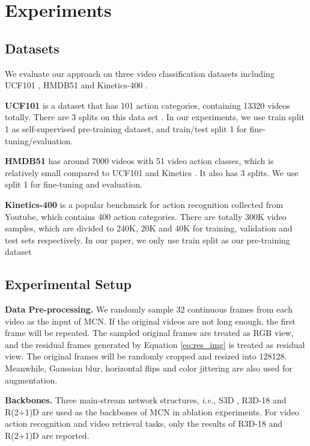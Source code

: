 \documentclass[10pt,twocolumn,letterpaper]{article}
\begin{document}
\section{Experiments}
\label{experiments}
\subsection{Datasets}
We evaluate our approach on three video classification datasets including UCF101 \cite{soomro2012ucf101}, HMDB51 \cite{kuehne2011hmdb} and Kinetics-400 \cite{kay2017kinetics}.

\textbf{UCF101} \cite{soomro2012ucf101} is a dataset that has 101 action categories, containing 13320 videos totally. There are 3 splits on this data set \cite{benaim2020speednet, xu2019self}. In our experiments, we use train split 1 as self-supervised pre-training dataset, and train/test split 1 for fine-tuning/evaluation.  

\textbf{HMDB51} \cite{kuehne2011hmdb} has around 7000 videos with 51 video action classes, which is relatively small compared to UCF101 and Kinetics \cite{kay2017kinetics}. It also has 3 splits. We use split 1 for fine-tuning and evaluation.

\textbf{Kinetics-400} \cite{kay2017kinetics} is a popular benchmark for action recognition collected from Youtube, which contains 400 action categories. There are totally 300K video samples, which  are  divided  to  240K,  20K  and  40K for training, validation and test sets respectively. In our paper, we only use train split as our pre-training dataset

\subsection{Experimental Setup}
\textbf{Data Pre-processing.} We randomly sample 32 continuous frames from each video as the input of MCN. If the original videos are not long enough, the first frame will be repeated. The sampled original frames are treated as RGB view, and the residual frames generated by Equation \ref{eq:res_img} is treated as residual view. The original frames will be randomly cropped and resized into 128128. Meanwhile, Gaussian blur, horizontal flips and color jittering are also used for augmentation.

\textbf{Backbones.} Three main-stream network structures, \textit{i.e.}, S3D \cite{xie2018rethinking}, R3D-18 \cite{hara2018can, tran2018closer} and R(2+1)D \cite{tran2018closer} are used as the backbones of MCN in ablation experiments. For video action recognition and video retrieval tasks, only the results of R3D-18 and R(2+1)D are reported.
\end{document}
